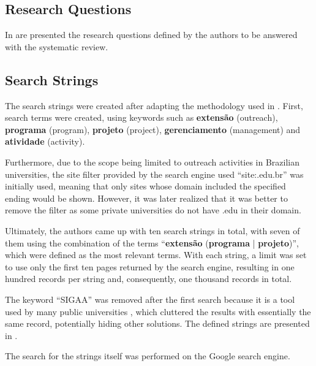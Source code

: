 

\subsection{Research Questions}\label{sec:gl-planning-rq}

In  are presented the research questions defined by the authors to be answered with the systematic review.



\subsection{Search Strings}\label{sec:gl-planning-strings}

The search strings were created after adapting the methodology used in \cite{godin2015applying}. First, search terms were created, using keywords such as \textbf{extensão} (outreach), \textbf{programa} (program), \textbf{projeto} (project), \textbf{gerenciamento} (management) and \textbf{atividade} (activity).

Furthermore, due to the scope being limited to outreach activities in Brazilian universities, the site filter provided by the search engine used ``site:.edu.br'' was initially used, meaning that only sites whose domain included the specified ending would be shown. However, it was later realized that it was better to remove the filter as some private universities do not have .edu in their domain.

Ultimately, the authors came up with ten search strings in total, with seven of them using the combination of the terms ``\textbf{extensão} (\textbf{programa} | \textbf{projeto})'', which were defined as the most relevant terms. With each string, a limit was set to use only the first ten pages returned by the search engine, resulting in one hundred records per string and, consequently, one thousand records in total.

The keyword ``\acs{SIGAA}'' was removed after the first search because it is a tool used by many public universities , which cluttered the results with essentially the same record, potentially hiding other solutions. The defined strings are presented in .



The search for the strings itself was performed on the Google search engine.

